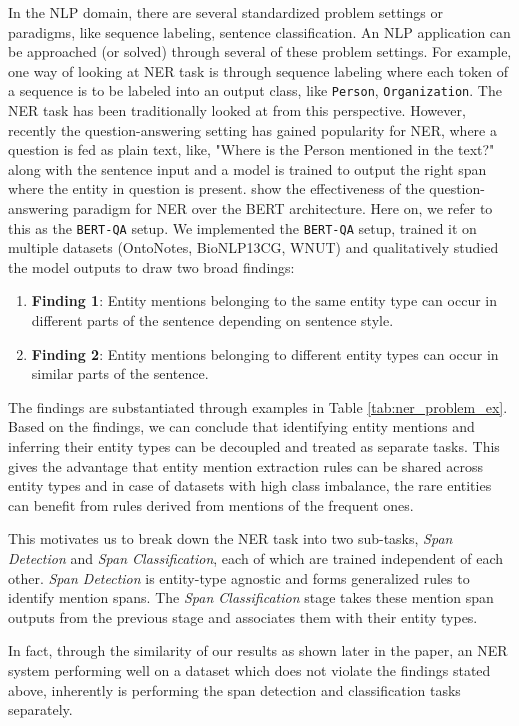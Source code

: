 In the NLP domain, there are several standardized problem settings or paradigms, like sequence labeling, sentence classification. An NLP application can be approached (or solved) through several of these problem settings. For example, one way of looking at NER task is through sequence labeling where each token of a sequence is to be labeled into an output class, like \texttt{Person}, \texttt{Organization}. The NER task has been traditionally looked at from this perspective. However, recently the question-answering setting has gained popularity for NER, where a question is fed as plain text, like, "Where is the Person mentioned in the text?" along with the sentence input and a model is trained to output the right span where the entity in question is present. \cite{} show the effectiveness of the question-answering paradigm for NER over the BERT architecture. Here on, we refer to this as the \texttt{BERT-QA} setup. We implemented the \texttt{BERT-QA} setup, trained it on multiple datasets (OntoNotes, BioNLP13CG, WNUT) and qualitatively studied the model outputs to draw two broad findings:

\begin{enumerate}
    \item \textbf{Finding 1}: Entity mentions belonging to the same entity type can occur in different parts of the sentence depending on sentence style.
    
    \item \textbf{Finding 2}: Entity mentions belonging to different entity types can occur in similar parts of the sentence.
\end{enumerate}

The findings are substantiated through examples in Table \ref{tab:ner_problem_ex}. Based on the findings, we can conclude that identifying entity mentions and inferring their entity types can be decoupled and treated as separate tasks. This gives the advantage that entity mention extraction rules can be shared across entity types and in case of datasets with high class imbalance, the rare entities can benefit from rules derived from mentions of the frequent ones. 

This motivates us to break down the NER task into two sub-tasks, \textit{Span Detection} and \textit{Span Classification}, each of which are trained independent of each other. \textit{Span Detection} is entity-type agnostic and forms generalized rules to identify mention spans. The \textit{Span Classification} stage takes these mention span outputs from the previous stage and associates them with their entity types.

In fact, through the similarity of our results as shown later in the paper, an NER system performing well on a dataset which does not violate the findings stated above, inherently is performing the span detection and classification tasks separately. 

